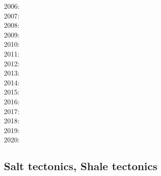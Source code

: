 {2006: \cite{tibs06}\cite{coma06}\cite{crwy06}\cite{peso06}\cite{lemm06}\cite{malm06}\\
2007: \cite{huha07}\cite{macl07}\cite{vabl07}\cite{dyrm07}\cite{hube07}\cite{buto07}\cite{socb07}
      \cite{werr07}\\
2008: \cite{cort08}\cite{gumb08}\cite{buhb08}\cite{hube08}\cite{peso08}\cite{rerw08}\cite{codh08}\\
2009: \cite{agcz09}\cite{kekj09}\cite{sihb09}\\
2010: \cite{aubh10}\cite{gery10}\cite{fosr10}\cite{gerya2010}\\
2011: \cite{alht11}\cite{ellw11}\cite{hube11}\\
2012: \cite{alht12}\cite{brps12}\cite{bein12}\\
2013: \cite{alhf13}\cite{brau13}\cite{chbe13}\cite{knak13}\cite{kern13}\cite{mipf13}\cite{wabd13}
      \cite{gery13}\cite{ligw13}\cite{gery13c}\cite{ebvk13}\\
2014: \cite{hebr14}\cite{lige14}\cite{brun14}\cite{kobf14}\cite{ebva14}\cite{puge14}\cite{lige14b}
      \cite{hube14}\cite{gogu14}\cite{ebva14}\cite{cosb14}\\
2015: \cite{nabu15}\cite{clbq15}\cite{huyb15}\cite{shmj15}\cite{svlh15}\cite{wulc15}\cite{olbi15}\\
2016: \cite{olbm16}\cite{jekm16}\cite{zwsn16}\\
2017: \cite{lemh17}\cite{brcr17}\cite{bekb17}\cite{nabp17}\\
2018: \cite{chsm18}\cite{brwm18}\cite{brun18}\cite{tebu18}\cite{jebu18}\cite{sahf18}\cite{pesn18}
      \cite{mord18}\cite{webe18}\cite{webe18b}\cite{gebu18}\\
2019: \cite{lisp19}\cite{zwsb19}\cite{anpa19}\cite{dual19}\cite{mocb19}\cite{chmd19}\cite{thhu19}
      \cite{jala19}\cite{zwsr19}\cite{hooi19}\\
2020: \cite{cump20}
}

\subsection{Salt tectonics, Shale tectonics}

